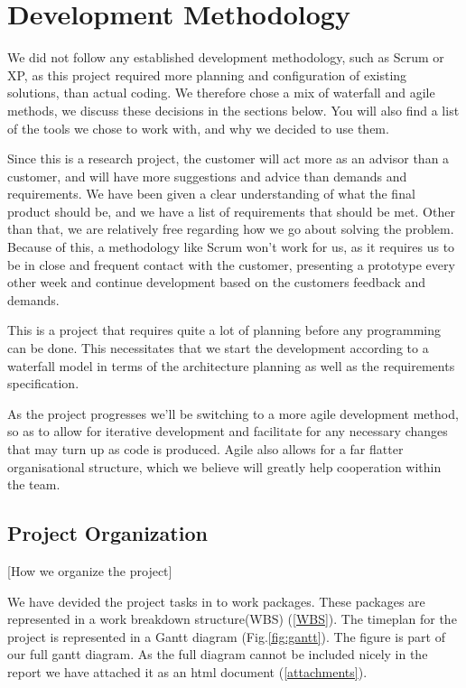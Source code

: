 \documentclass[12pt]{article}
\begin{document}
\section{Development Methodology}\label{methodology} 
    We did not follow any established development methodology, such as Scrum or XP, as this project required more planning and configuration of existing solutions, than actual coding. We therefore chose a mix of waterfall and agile methods, we discuss these decisions in the sections below. You will also find a list of the tools we chose to work with, and why we decided to use them. 
    
    Since this is a research project, the customer will act more as an advisor than a customer, and will have more suggestions and advice than demands and requirements. We have been given a clear understanding of what the final product should be, and we have a list of requirements that should be met. Other than that, we are relatively free regarding how we go about solving the problem. Because of this, a methodology like Scrum won't work for us, as it requires us to be in close and frequent contact with the customer, presenting a prototype every other week and continue development based on the customers feedback and demands.
    
    This is a project that requires quite a lot of planning before any programming can be done. This necessitates that we start the development according to a waterfall model in terms of the architecture planning as well as the requirements specification.
    
    As the project progresses we’ll be switching to a more agile development method, so as to allow for iterative development and facilitate for any necessary changes that may turn up as code is produced. Agile also allows for a far flatter organisational structure, which we believe will greatly help cooperation within the team.

    \subsection{Project Organization}\label{projectorg}[How we organize the project]
    
    We have devided the project tasks in to work packages. These packages are represented in a work breakdown structure(WBS) (\ref{WBS}). The timeplan for the project is represented in a Gantt diagram (Fig.\ref{fig:gantt}). The figure is part of our full gantt diagram. As the full diagram cannot be included nicely in the report we have attached it as an html document (\ref{attachments}).
     
\end{document}
